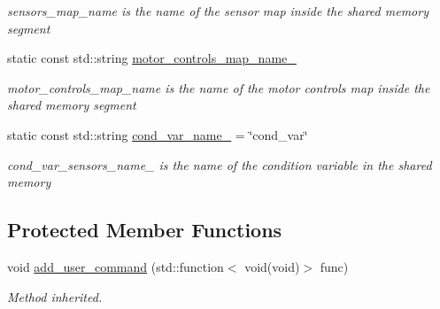 \begin{DoxyCompactItemize}
\begin{DoxyCompactList}\small\item\em sensors\+\_\+map\+\_\+name is the name of the sensor map inside the shared memory segment \end{DoxyCompactList}\item 
static const std\+::string \hyperlink{classdynamic__graph_1_1DynamicGraphManager_a056de4d7a49496b2b0812d96d93370d9}{motor\+\_\+controls\+\_\+map\+\_\+name\+\_\+}
\begin{DoxyCompactList}\small\item\em motor\+\_\+controls\+\_\+map\+\_\+name is the name of the motor controls map inside the shared memory segment \end{DoxyCompactList}\item 
static const std\+::string \hyperlink{classdynamic__graph_1_1DynamicGraphManager_a909b8d2d024a2a11473fa2d94a18002e}{cond\+\_\+var\+\_\+name\+\_\+} = \char`\"{}cond\+\_\+var\char`\"{}\hypertarget{classdynamic__graph_1_1DynamicGraphManager_a909b8d2d024a2a11473fa2d94a18002e}{}\label{classdynamic__graph_1_1DynamicGraphManager_a909b8d2d024a2a11473fa2d94a18002e}

\begin{DoxyCompactList}\small\item\em cond\+\_\+var\+\_\+sensors\+\_\+name\+\_\+ is the name of the condition variable in the shared memory \end{DoxyCompactList}\end{DoxyCompactItemize}
\subsection*{Protected Member Functions}
\begin{DoxyCompactItemize}
\item 
void \hyperlink{classdynamic__graph_1_1DynamicGraphManager_a72146c4ddd173869a512e9f174ad48df}{add\+\_\+user\+\_\+command} (std\+::function$<$ void(void)$>$ func)
\begin{DoxyCompactList}\small\item\em Method inherited. \end{DoxyCompactList}\end{DoxyCompactItemize}
